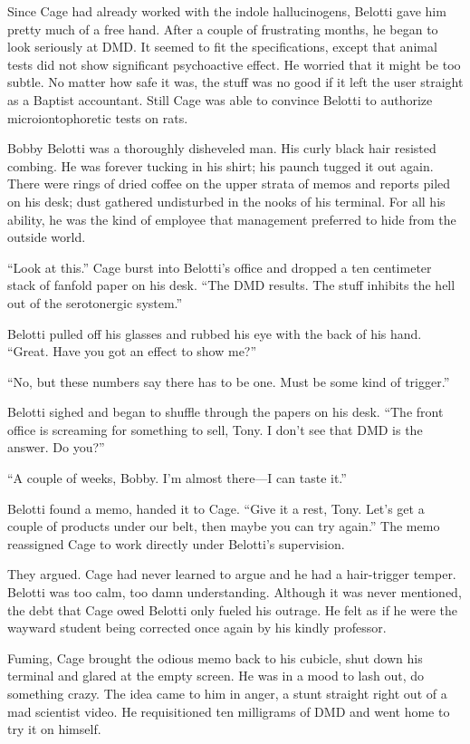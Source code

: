 Since Cage had already worked with the indole hallucinogens, Belotti gave him pretty much of a free hand. After a couple of frustrating months, he began to look seriously at DMD. It seemed to fit the specifications, except that animal tests did not show significant psychoactive effect. He worried that it might be too subtle. No matter how safe it was, the stuff was no good if it left the user straight as a Baptist accountant. Still Cage was able to convince Belotti to authorize microiontophoretic tests on rats.

Bobby Belotti was a thoroughly disheveled man. His curly black hair resisted combing. He was forever tucking in his shirt; his paunch tugged it out again. There were rings of dried coffee on the upper strata of memos and reports piled on his desk; dust gathered undisturbed in the nooks of his terminal. For all his ability, he was the kind of employee that management preferred to hide from the outside world.

``Look at this.'' Cage burst into Belotti's office and dropped a ten centimeter stack of fanfold paper on his desk. ``The DMD results. The stuff inhibits the hell out of the serotonergic system.''

Belotti pulled off his glasses and rubbed his eye with the back of his hand. ``Great. Have you got an effect to show me?''

``No, but these numbers say there has to be one. Must be some kind of trigger.''

Belotti sighed and began to shuffle through the papers on his desk. ``The front office is screaming for something to sell, Tony. I don't see that DMD is the answer. Do you?''

``A couple of weeks, Bobby. I'm almost there---I can taste it.''

Belotti found a memo, handed it to Cage. ``Give it a rest, Tony. Let's get a couple of products under our belt, then maybe you can try again.'' The memo reassigned Cage to work directly under Belotti's supervision.

They argued. Cage had never learned to argue and he had a hair-trigger temper. Belotti was too calm, too damn understanding. Although it was never mentioned, the debt that Cage owed Belotti only fueled his outrage. He felt as if he were the wayward student being corrected once again by his kindly professor.

Fuming, Cage brought the odious memo back to his cubicle, shut down his terminal and glared at the empty screen. He was in a mood to lash out, do something crazy. The idea came to him in anger, a stunt straight right out of a mad scientist video. He requisitioned ten milligrams of DMD and went home to try it on himself.

